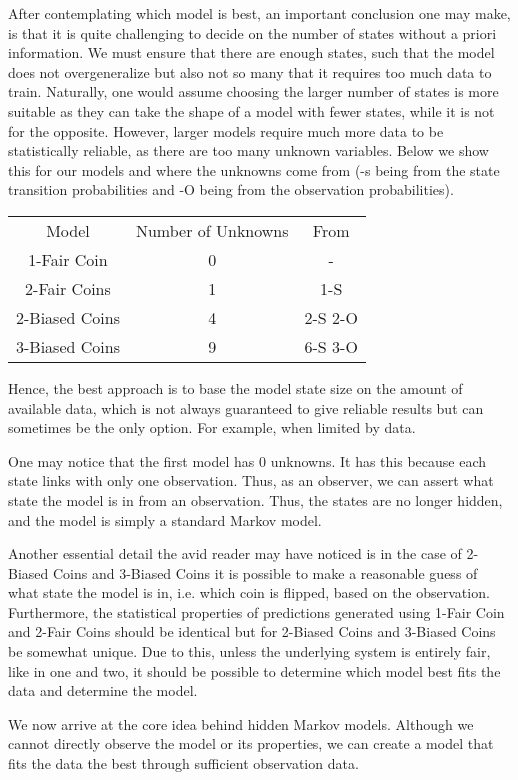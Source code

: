 After contemplating which model is best, an important conclusion one may make, is that it is quite challenging to decide on the number of states without a priori information. We must ensure that there are enough states, such that the model does not overgeneralize but also not so many that it requires too much data to train. Naturally, one would assume choosing the larger number of states is more suitable as they can take the shape of a model with fewer states, while it is not for the opposite. However, larger models require much more data to be statistically reliable, as there are too many unknown variables. Below we show this for our models and where the unknowns come from (-s being from the state transition probabilities and -O being from the observation probabilities). 

\begin{center}
    \begin{tabular}{c c c}
        Model  & Number of Unknowns & From\\
        1-Fair Coin    & 0 & - \\
        2-Fair Coins   & 1 & 1-S\\ 
        2-Biased Coins & 4 & 2-S 2-O\\
        3-Biased Coins & 9 & 6-S 3-O
    \end{tabular}
\end{center}

Hence, the best approach is to base the model state size on the amount of available data, which is not always guaranteed to give reliable results but can sometimes be the only option. For example, when limited by data.

One may notice that the first model has 0 unknowns. It has this because each state links with only one observation. Thus, as an observer, we can assert what state the model is in from an observation. Thus, the states are no longer hidden, and the model is simply a standard Markov model. 

Another essential detail the avid reader may have noticed is in the case of 2-Biased Coins and 3-Biased Coins it is possible to make a reasonable guess of what state the model is in, i.e. which coin is flipped, based on the observation. Furthermore, the statistical properties of predictions generated using 1-Fair Coin and 2-Fair Coins should be identical but for 2-Biased Coins and 3-Biased Coins be somewhat unique. Due to this, unless the underlying system is entirely fair, like in one and two, it should be possible to determine which model best fits the data and determine the model.


We now arrive at the core idea behind hidden Markov models. Although we cannot directly observe the model or its properties, we can create a model that fits the data the best through sufficient observation data. 
